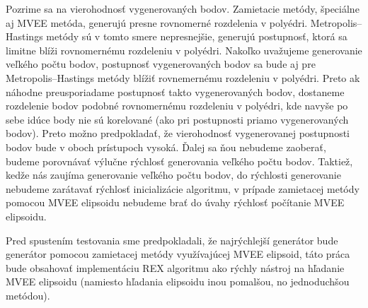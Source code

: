 Pozrime sa na vierohodnosť vygenerovaných bodov. Zamietacie metódy, špeciálne aj MVEE metóda, generujú presne rovnomerné rozdelenia v polyédri. Metropolis--Hastings metódy sú v tomto smere nepresnejšie, generujú postupnosť, ktorá sa limitne blíži rovnomernému rozdeleniu v polyédri. Nakoľko uvažujeme generovanie veľkého počtu bodov, postupnosť vygenerovaných bodov sa bude aj pre Metropolis--Hastings metódy blížiť rovnemernému rozdeleniu v polyédri. Preto ak náhodne preusporiadame postupnosť takto vygenerovaných bodov, dostaneme rozdelenie bodov podobné rovnomernému rozdeleniu v polyédri, kde navyše po sebe idúce body nie sú korelované (ako pri postupnosti priamo vygenerovaných bodov). Preto možno predpokladať, že vierohodnosť vygenerovanej postupnosti bodov bude v oboch prístupoch vysoká. Ďalej sa ňou nebudeme zaoberať, budeme porovnávať výlučne rýchlosť generovania veľkého počtu bodov. Taktiež, kedže nás zaujíma generovanie veľkého počtu bodov, do rýchlosti generovanie nebudeme zarátavať rýchlosť inicializácie algoritmu, v prípade zamietacej metódy pomocou MVEE elipsoidu nebudeme brať do úvahy rýchlosť počítanie MVEE elipsoidu.

Pred spustením testovania sme predpokladali, že najrýchlejší generátor bude generátor pomocou zamietacej metódy využívajúcej MVEE elipsoid, táto práca bude obsahovať implementáciu REX algoritmu ako rýchly nástroj na hľadanie MVEE elipsoidu (namiesto hľadania elipsoidu inou pomalšou, no jednoduchšou metódou).
